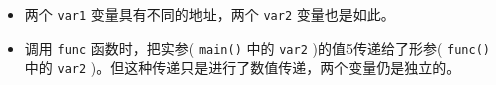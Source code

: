 \begin{frame}[fragile]\ft{\secname}
\begin{itemize}
\item 两个 \lstinline|var1| 变量具有不同的地址，两个 \lstinline|var2| 变量也是如此。\\[0.1in]
\item 调用 \lstinline|func| 函数时，把实参( \lstinline|main()| 中的 \lstinline|var2| )的值5传递给了形参( \lstinline|func()| 中的 \lstinline|var2| )。但这种传递只是进行了数值传递，两个变量仍是独立的。
\end{itemize}
\end{frame}



